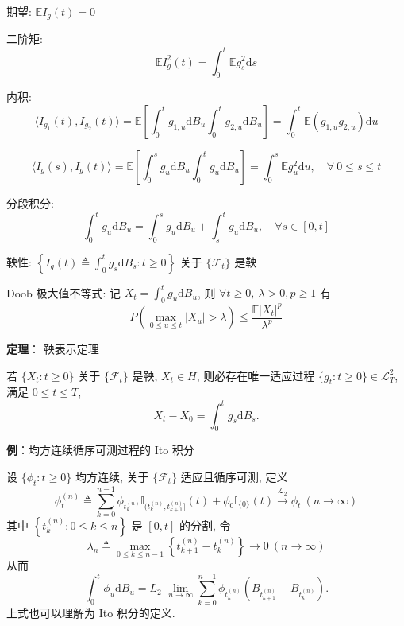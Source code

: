 \documentclass[openany]{ctexbook}
\theoremstyle{kaiti}
\theoremstyle{normal}
\begin{document}
期望: $\mathbb{E}I_g(t)=0$

二阶矩:
\begin{equation}
  \mathbb{E}I_g^2(t)=\int_0^t\mathbb{E}g_s^2\mathrm{d}s
\end{equation}


内积:
\begin{equation}
  \langle I_{g_1}(t),I_{g_2}(t)\rangle=\mathbb{E}\left[\int_0^tg_{1,u}\mathrm{d}B_u\int_0^tg_{2,u}\mathrm{d}B_u\right]=\int_0^t \mathbb{E}(g_{1,u}g_{2,u})\mathrm{d}u
\end{equation}

\begin{equation}
  \langle I_{g}(s),I_{g}(t)\rangle=\mathbb{E}\left[\int_0^sg_{u}\mathrm{d}B_u\int_0^tg_{u}\mathrm{d}B_u\right]=\int_0^s \mathbb{E}g_u^2\mathrm{d}u,\quad\forall~0\leqslant s\leqslant t
\end{equation}


分段积分:
\begin{equation}
  \int_0^tg_u\mathrm{d}B_u=\int_0^sg_u\mathrm{d}B_u+\int_s^tg_u\mathrm{d}B_u,\quad\forall s\in[0,t]
\end{equation}


鞅性: $\displaystyle\left\{I_g(t)\triangleq\int_0^tg_s\mathrm{d}B_s:t\geqslant0\right\}$ 关于 $\{\mathcal{F}_t\}$ 是鞅

Doob 极大值不等式: 记 $\displaystyle X_t=\int_0^tg_u\mathrm{d}B_u$, 则 $\forall t\geqslant0,~\lambda>0,p\geqslant1$ 有
\begin{equation}
  P\left(\max_{0\leqslant u\leqslant t}|X_u|>\lambda\right)\leqslant\frac{\mathbb{E}|X_t|^p}{\lambda^p}
\end{equation}


\textbf{定理}： 鞅表示定理

若 $\{X_t:t\geqslant0\}$ 关于 $\{\mathcal{F}_t\}$ 是鞅, $X_t\in H$, 则必存在唯一适应过程 $\{g_t:t\geqslant0\}\in\mathcal{L}_T^2$, 满足 $0\leqslant t\leqslant T$,
\begin{equation}
  X_t-X_0=\int_0^tg_s\mathrm{d}B_s.
\end{equation}


\textbf{例}：均方连续循序可测过程的 Ito 积分

设 $\{\phi_t:t\geqslant0\}$ 均方连续, 关于 $\{\mathcal{F}_t\}$ 适应且循序可测, 定义
\begin{equation}
  \phi_t^{(n)}\triangleq\sum_{k=0}^{n-1}\phi_{t_k^{(n)}}\mathbb{I}_{(t_k^{(n)},t_{k+1}^{(n)}]}(t)+\phi_0\mathbb{I}_{\{0\}}(t)\overset{\mathrm{\mathcal{L}_2}}{\to}\phi_t~(n\to\infty)
\end{equation}
 其中 $\left\{t_k^{(n)}:0\leqslant k\leqslant n\right\}$ 是 $[0,t]$ 的分割, 令
\begin{equation}
  \lambda_n\triangleq\max_{0\leqslant k\leqslant n-1}\left\{t_{k+1}^{(n)}-t_{k}^{(n)}\right\}\to0~(n\to\infty)
\end{equation}
 从而
\begin{equation}
  \int_0^t\phi_u\mathrm{d}B_u=L_2\text{-}\lim_{n\to\infty}\sum_{k=0}^{n-1}\phi_{t_k^{(n)}}\left(B_{t_{k+1}^{(n)}}-B_{t_{k}^{(n)}}\right).
\end{equation}
 上式也可以理解为 Ito 积分的定义.
\end{document}
